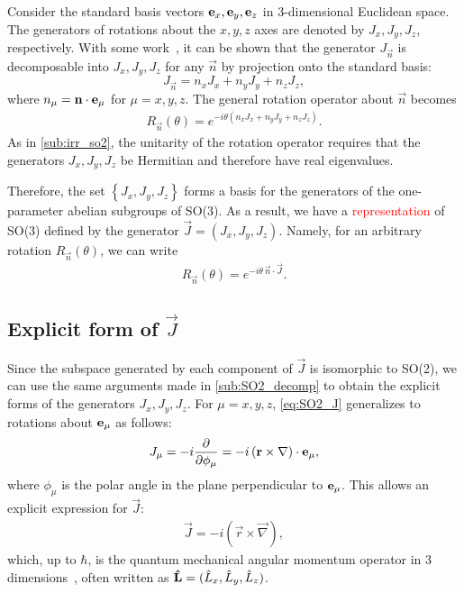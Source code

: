     Consider the standard basis vectors $\mathbf{e}_x,\mathbf{e}_y,\mathbf{e}_z$ in 3-dimensional Euclidean space. The generators of rotations about the $x,y,z$ axes are denoted by $J_x,J_y,J_z$, respectively. With some work~\cite{Tung1985}, it can be shown that the generator $J_{\vec{n}}$ is decomposable into $J_x,J_y,J_z$ for any $\vec{n}$ by projection onto the standard basis:
    \begin{equation}
        J_{\vec{n}} = n_x J_x + n_y J_y + n_z J_z,
    \end{equation}
    where $n_\mu = \mathbf{n}\cdot\mathbf{e}_\mu$ for $\mu=x,y,z$.
    The general rotation operator about $\vec{n}$ becomes
    \begin{align*}
        R_{\vec{n}}(\theta) = e^{-i\theta(n_x J_x + n_y J_y + n_z J_z)}.
    \end{align*}
    As in \cref{sub:irr_so2}, the unitarity of the rotation operator requires that the generators $J_x,J_y,J_z$ be Hermitian and therefore have real eigenvalues.

    Therefore, the set $\left\{ J_x,J_y,J_z \right\}$ forms a basis for the generators of the one-parameter abelian subgroups of SO(3). As a result, we have a \textcolor{red}{representation} of SO(3) defined by the generator $\vec{J} = (J_x,J_y,J_z)$. Namely, for an arbitrary rotation $R_{\vec{n}}(\theta)$, we can write
    \begin{align*}
        R_{\vec{n}}(\theta) = e^{-i\theta\,\vec{n}\cdot\vec{J}}.
    \end{align*}
    
    \subsection{Explicit form of $\vec{J}$}\label{sec:SO3_J}
    Since the subspace generated by each component of $\vec{J}$ is isomorphic to SO(2), we can use the same arguments made in \cref{sub:SO2_decomp} to obtain the explicit forms of the generators $J_x,J_y,J_z$. For $\mu=x,y,z$, \cref{eq:SO2_J} generalizes to rotations about $\mathbf{e}_\mu$ as follows:
    \begin{align*}
        J_\mu = -i \frac{\partial}{\partial\phi_\mu} = -i \left( \mathbf{r}\times\mathbf{\nabla} \right)\cdot\mathbf{e}_\mu,
    \end{align*}
    where $\phi_\mu$ is the polar angle in the plane perpendicular to $\mathbf{e}_\mu$. This allows an explicit expression for $\vec{J}$:
    \begin{align}
        \vec{J} = -i \left( \vec{r}\times\vec{\nabla} \right),
    \end{align}
    which, up to $\hbar$, is the quantum mechanical angular momentum operator in 3 dimensions~\cite{Hall2013}, often written as $\mathbf{\hat{L}}=(\hat{L}_x,\hat{L}_y,\hat{L}_z)$.

